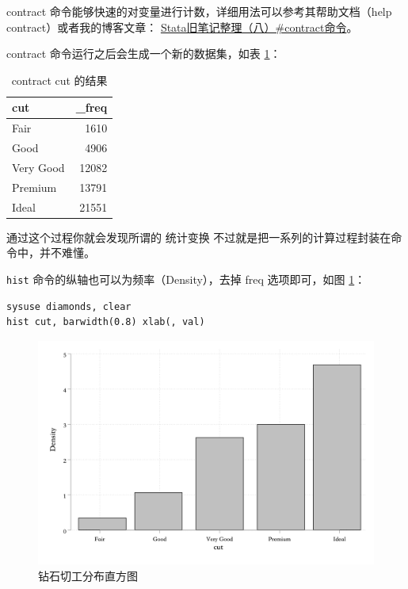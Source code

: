 contract 命令能够快速的对变量进行计数，详细用法可以参考其帮助文档（help contract）或者我的博客文章： \href{https://www.czxa.top/posts/1170/\#contract\%E5\%91\%BD\%E4\%BB\%A4}{Stata旧笔记整理（八）\#contract命令}。

contract 命令运行之后会生成一个新的数据集，如表 \ref{tab:cut}：

\begin{table}[htbp]
\caption{\label{tab:cut}contract cut 的结果}
\centering
\begin{tabular}{lr}
\toprule
cut & \_freq\\
\midrule
Fair & 1610\\
Good & 4906\\
Very Good & 12082\\
Premium & 13791\\
Ideal & 21551\\
\bottomrule
\end{tabular}
\end{table}

通过这个过程你就会发现所谓的 \textcolor{third3}{统计变换} 不过就是把一系列的计算过程封装在命令中，并不难懂。

\texttt{hist} 命令的纵轴也可以为频率（Density），去掉 freq 选项即可，如图 \ref{fig:histcut2}：

\begin{lstlisting}
sysuse diamonds, clear
hist cut, barwidth(0.8) xlab(, val)
\end{lstlisting}

\begin{figure}[htbp]
  \centering \includegraphics[width=\textwidth]{assets/histcut2.png}
  \caption{钻石切工分布直方图}\label{fig:histcut2}
\end{figure}

